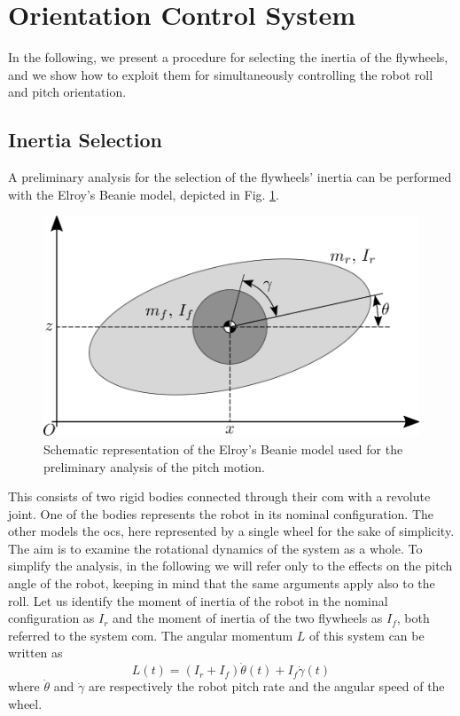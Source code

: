 \documentclass[letterpaper, 10 pt, conference]{ieeeconf}  %
\begin{document}
\section{Orientation Control System}
In the following, we present a procedure for selecting the inertia of the flywheels, and we show how to exploit them for simultaneously controlling the robot roll and pitch orientation.
\subsection{Inertia Selection}
A preliminary analysis for the selection of the flywheels' inertia can be performed with the Elroy's Beanie model, depicted in Fig. \ref{fig:elroy-beanie}.
\begin{figure}
	\centering
	\includegraphics[width=.7\linewidth]{figures/elroys-beanie.eps}
	\caption{\small Schematic representation of the Elroy's Beanie model used for the preliminary analysis of the pitch motion.}
	\label{fig:elroy-beanie}
\end{figure} 
This consists of two rigid bodies connected through their \gls{com} with a revolute joint. One of the bodies represents the robot in its nominal configuration. The other models the \gls{ocs}, here represented by a single wheel for the sake of simplicity. The aim is to examine the rotational dynamics of the system as a whole. To simplify the analysis, in the following we will refer only to the effects on the pitch angle of the robot, keeping in mind that the same arguments apply also to the roll. 
Let us identify the moment of inertia of the robot in the nominal configuration as $I_r$ and the moment of inertia of the two flywheels as $I_f$, both referred to the system \gls{com}.
The angular momentum $L$ of this system can be written as
\begin{equation}\label{eq:ang_mom_elroy}
L(t) = \left(I_r + I_{f}\right)\dot{\theta}(t) + I_{f}\dot{\gamma}(t)
\end{equation}
where $\dot{\theta}$ and $\dot{\gamma}$ are respectively the robot pitch rate and the angular speed of the wheel.
\end{document}
